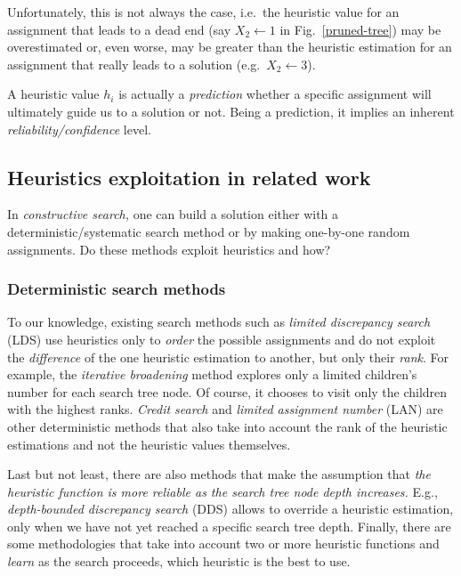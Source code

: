 \documentclass{ws-ijait}
\begin{document}
Unfortunately, this is not always the case, i.e.\ the
heuristic value for an assignment that leads to a dead end
(say $X_2 \gets 1$ in Fig.~\ref{pruned-tree}) may be
overestimated or, even worse, may be greater than the
heuristic estimation for an assignment that really leads to
a solution (e.g.\ $X_2 \gets 3$).

A heuristic value $h_i$ is actually a \emph{prediction}
whether a specific assignment will ultimately guide us to a
solution or not. Being a prediction, it implies an inherent
\emph{reliability\slash confidence} level.

\subsection{Heuristics exploitation in related work}

In \emph{constructive search,} one can build a solution
either with a deterministic\slash systematic search method
or by making one-by-one random assignments. Do these methods
exploit heuristics and how?

\subsubsection{Deterministic search
               methods\label{deterministic}}

To our knowledge, existing search methods such as
\emph{limited discrepancy search} (LDS) use heuristics only
to \emph{order} the possible assignments and do not exploit
the \emph{difference} of the one heuristic estimation to
another, but only their \emph{rank}.\cite{Prosser2011} For
example, the \emph{iterative broadening} method explores
only a limited children's number for each search tree
node.\cite{Ginsberg1992} Of course, it chooses to visit only
the children with the highest ranks. \emph{Credit
search}\cite{Bartak2004} and \emph{limited assignment
number} (LAN)\cite{Bartak2005} are other deterministic
methods that also take into account the rank of the
heuristic estimations and not the heuristic values
themselves.

Last but not least, there are also methods that make the
assumption that \emph{the heuristic function is more
reliable as the search tree node depth increases.} E.g.,
\emph{depth-bounded discrepancy search} (DDS) allows to
override a heuristic estimation, only when we have not yet
reached a specific search tree depth.\cite{Walsh1997}
Finally, there are some methodologies that take into account
two or more heuristic functions and \emph{learn} as the
search proceeds, which heuristic is the best to
use.\cite{Xu2009}
\end{document}
